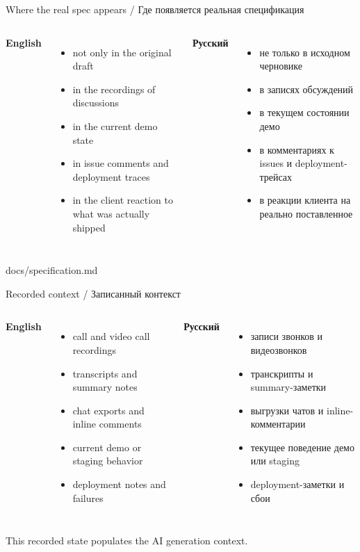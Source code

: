 \documentclass[aspectratio=169]{beamer}
\newcommand{\BilingualFrame}[4]{
  \begin{frame}{#1}
    \small
    \begin{columns}[T,onlytextwidth]
      \column{0.48\textwidth}
      \textbf{English}
      #2
      \column{0.48\textwidth}
      \textbf{Русский}
      #3
    \end{columns}
    \vfill
    {\tiny #4}
  \end{frame}
}
\begin{document}
\BilingualFrame
  {Where the real spec appears / Где появляется реальная спецификация}
  {
    \begin{itemize}
      \item not only in the original draft
      \item in the recordings of discussions
      \item in the current demo state
      \item in issue comments and deployment traces
      \item in the client reaction to what was actually shipped
    \end{itemize}
  }
  {
    \begin{itemize}
      \item не только в исходном черновике
      \item в записях обсуждений
      \item в текущем состоянии демо
      \item в комментариях к issues и deployment-трейсах
      \item в реакции клиента на реально поставленное
    \end{itemize}
  }
  {docs/specification.md}

\BilingualFrame
  {Recorded context / Записанный контекст}
  {
    \begin{itemize}
      \item call and video call recordings
      \item transcripts and summary notes
      \item chat exports and inline comments
      \item current demo or staging behavior
      \item deployment notes and failures
    \end{itemize}
  }
  {
    \begin{itemize}
      \item записи звонков и видеозвонков
      \item транскрипты и summary-заметки
      \item выгрузки чатов и inline-комментарии
      \item текущее поведение демо или staging
      \item deployment-заметки и сбои
    \end{itemize}
  }
  {This recorded state populates the AI generation context.}
\end{document}
